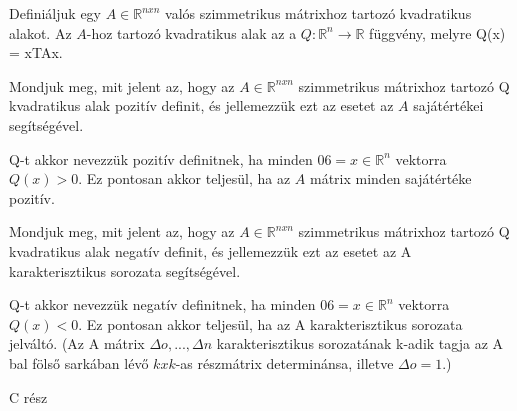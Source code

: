 \begin{frame}
  \begin{tcolorbox}[title={45}]
    Definiáljuk egy $A \in \mathbb{R}^{n x n}$ valós szimmetrikus mátrixhoz tartozó kvadratikus alakot.
  \tcblower
Az $A$-hoz tartozó kvadratikus alak az a $Q : \mathbb{R}^n {\rightarrow} \mathbb{R}$ függvény, melyre Q(x) = xTAx.
  \end{tcolorbox}
\end{frame}

\begin{frame}
  \begin{tcolorbox}[title={46}]
     Mondjuk meg, mit jelent az, hogy az $A \in \mathbb{R}^{n x n}$ szimmetrikus mátrixhoz tartozó Q kvadratikus alak pozitív definit, és jellemezzük ezt az esetet az $A$ sajátértékei segítségével.

  \tcblower
Q-t akkor nevezzük pozitív definitnek, ha minden $0 6= x \in \mathbb{R}^n$ vektorra $Q(x) > 0$. Ez pontosan akkor teljesül, ha az $A$ mátrix minden sajátértéke pozitív.
  \end{tcolorbox}
\end{frame}


\begin{frame}
  \begin{tcolorbox}[title={46}]
     Mondjuk meg, mit jelent az, hogy az $A \in \mathbb{R}^{n x n}$ szimmetrikus mátrixhoz tartozó Q kvadratikus alak negatív definit, és jellemezzük ezt az esetet az A karakterisztikus sorozata segítségével.

  \tcblower
Q-t akkor nevezzük negatív definitnek, ha minden $0 6= x \in \mathbb{R}^n$ vektorra $Q(x) < 0$. Ez pontosan akkor teljesül, ha az A karakterisztikus sorozata jelváltó. (Az A mátrix ${\Delta}o,...,{\Delta}n$ karakterisztikus sorozatának k-adik tagja az A bal fölső sarkában lévő $k x k$-as részmátrix determinánsa, illetve ${\Delta}o = 1$.)

  \end{tcolorbox}
\end{frame}




\begin{frame}[plain]
\begin{tcolorbox}[center, colback={myyellow}, coltext={black}, colframe={myyellow}]
    {\RHuge C rész}
    \mmedskip
\end{tcolorbox}
\end{frame}


